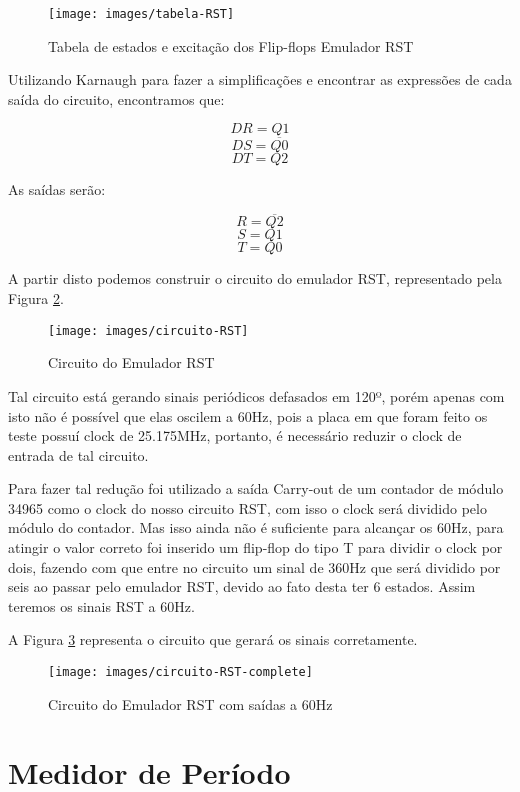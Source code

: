 \documentclass[12pt,a4paper,openany]{abntex2}
\begin{document}
\begin{figure}[!htp]
	\centering
	\caption{Tabela de estados e excitação dos Flip-flops Emulador RST}
	\texttt{[image: images/tabela-RST]}
	\label{fig:tabela-RST}
\end{figure}

Utilizando Karnaugh para fazer a simplificações e encontrar as expressões de cada saída do circuito, encontramos que:

$$DR = Q1$$
$$DS = \overline{Q0}$$
$$DT = Q2$$

As saídas serão:

$$R = \overline{Q2}$$
$$S = Q1$$
$$T = Q0$$

A partir disto podemos construir o circuito do emulador RST, representado pela Figura \ref{fig:circuito-RST}.

\begin{figure}[!htp]
	\centering
	\caption{Circuito do Emulador RST}
	\texttt{[image: images/circuito-RST]}
	\label{fig:circuito-RST}
\end{figure}

Tal circuito está gerando sinais periódicos defasados em 120º, porém apenas com isto não é possível que elas oscilem a 60Hz, pois a placa em que foram feito os teste possuí clock de 25.175MHz, portanto, é necessário reduzir o clock de entrada de tal circuito. 

Para fazer tal redução foi utilizado a saída Carry-out de um contador de módulo 34965 como o clock do nosso circuito RST, com isso o clock será dividido pelo módulo do contador. Mas isso ainda não é suficiente para alcançar os 60Hz, para atingir o valor correto foi inserido um flip-flop do tipo T para dividir o clock por dois, fazendo com que entre no circuito um sinal de 360Hz que será dividido por seis ao passar pelo emulador RST, devido ao fato desta ter 6 estados. Assim teremos os sinais RST a 60Hz.

A Figura \ref{fig:circuito-RST-complete} representa o circuito que gerará os sinais corretamente.

\begin{figure}[!htp]
	\centering
	\caption{Circuito do Emulador RST com saídas a 60Hz}
	\texttt{[image: images/circuito-RST-complete]}
	\label{fig:circuito-RST-complete}
\end{figure}

\section{Medidor de Período}
\end{document}

